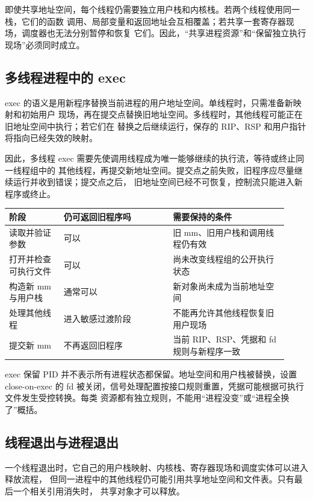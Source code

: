 即使共享地址空间，每个线程仍需要独立用户栈和内核栈。若两个线程使用同一栈，它们的函数
调用、局部变量和返回地址会互相覆盖；若共享一套寄存器现场，调度器也无法分别暂停和恢复
它们。因此，“共享进程资源”和“保留独立执行现场”必须同时成立。

\subsection{多线程进程中的 exec}

exec 的语义是用新程序替换当前进程的用户地址空间。单线程时，只需准备新映射和初始用户
现场，再在提交点替换旧地址空间。多线程时，其他线程可能正在旧地址空间中执行；若它们在
替换之后继续运行，保存的 RIP、RSP 和用户指针将指向已经失效的映射。

因此，多线程 exec 需要先使调用线程成为唯一能够继续的执行流，等待或终止同一线程组中的
其他线程，再提交新地址空间。提交点之前失败，旧程序应尽量继续运行并收到错误；提交点之后，
旧地址空间已经不可恢复，控制流只能进入新程序或终止。

\begin{longtable}{|L{0.18\linewidth}|L{0.36\linewidth}|L{0.38\linewidth}|}
\toprule
阶段 & 仍可返回旧程序吗 & 需要保持的条件 \\
\midrule
读取并验证参数 & 可以 & 旧 mm、旧用户栈和调用线程仍有效 \\\tablerowrule
打开并检查可执行文件 & 可以 & 尚未改变线程组的公开执行状态 \\\tablerowrule
构造新 mm 与用户栈 & 通常可以 & 新对象尚未成为当前地址空间 \\\tablerowrule
处理其他线程 & 进入敏感过渡阶段 & 不能再允许其他线程恢复旧用户现场 \\\tablerowrule
提交新 mm & 不再返回旧程序 & 当前 RIP、RSP、凭据和 fd 规则与新程序一致 \\
\bottomrule
\end{longtable}

exec 保留 PID 并不表示所有进程状态都保留。地址空间和用户栈被替换，设置 close-on-exec
的 fd 被关闭，信号处理配置按接口规则重置，凭据可能根据可执行文件发生受控转换。每类
资源都有独立规则，不能用“进程没变”或“进程全换了”概括。

\subsection{线程退出与进程退出}

一个线程退出时，它自己的用户栈映射、内核栈、寄存器现场和调度实体可以进入释放流程，
但同一进程中的其他线程仍可能引用共享地址空间和文件表。只有最后一个相关引用消失时，
共享对象才可以释放。


